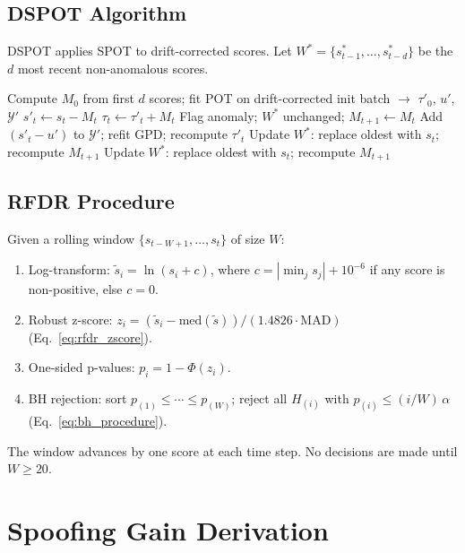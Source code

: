 \documentclass[11pt]{report}
\begin{document}
\section{DSPOT Algorithm}\label{app:thresholds:dspot}

DSPOT applies SPOT to drift-corrected scores. Let $W^* = \{s^*_{t-1}, \ldots, s^*_{t-d}\}$ be the $d$ most recent non-anomalous scores.

\begin{algorithmic}[1]
\State Compute $M_0$ from first $d$ scores; fit POT on drift-corrected init batch $\to$ $\tau'_0$, $u'$, $\mathcal{Y}'$
  \State $s'_t \gets s_t - M_t$ 
  \State $\tau_t \gets \tau'_t + M_t$ 
    \State Flag anomaly; $W^*$ unchanged; $M_{t+1} \gets M_t$
    \State Add $(s'_t - u')$ to $\mathcal{Y}'$; refit GPD; recompute $\tau'_t$
    \State Update $W^*$: replace oldest with $s_t$; recompute $M_{t+1}$
  \Else
    \State Update $W^*$: replace oldest with $s_t$; recompute $M_{t+1}$
  \EndIf
\EndFor
\end{algorithmic}

\section{RFDR Procedure}\label{app:thresholds:rfdr}

Given a rolling window $\{s_{t-W+1}, \ldots, s_t\}$ of size $W$:
\begin{enumerate}
  \item Log-transform: $\tilde{s}_i = \ln(s_i + c)$, where $c = |\min_j s_j| + 10^{-6}$ if any score is non-positive, else $c = 0$.
  \item Robust z-score: $z_i = (\tilde{s}_i - \mathrm{med}(\tilde{s})) / (1.4826 \cdot \mathrm{MAD})$ (Eq.~\ref{eq:rfdr_zscore}).
  \item One-sided p-values: $p_i = 1 - \Phi(z_i)$.
  \item BH rejection: sort $p_{(1)} \leq \cdots \leq p_{(W)}$; reject all $H_{(i)}$ with $p_{(i)} \leq (i/W)\,\alpha$ (Eq.~\ref{eq:bh_procedure}).
\end{enumerate}
The window advances by one score at each time step. No decisions are made until $W \geq 20$.

\chapter{Spoofing Gain Derivation}\label{app:spoofing}
\end{document}
